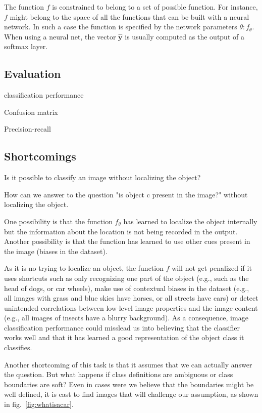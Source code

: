 The function $f$ is constrained to belong to a set of possible function. For instance, $f$ might belong to the space of all the functions that can be built with a neural network. In such a case the function is specified by the network parameters $\theta: f_\theta$. When using a neural net, the vector $\hat{\mathbf{y}}$ is usually computed as the output of a softmax layer.

\subsection{Evaluation}

classification performance

Confusion matrix

Precision-recall

\subsection{Shortcomings}


Is it possible to classify an image without localizing the object?

How can we answer to the question "is object c present in the image?" without localizing the object.

One possibility is that the function $f_\theta$ has learned to localize the object internally but the information about the location is not being recorded in the output. Another possibility is that the function has learned to use other cues present in the image (biases in the dataset).

As it is no trying to localize an object, the function $f$ will not get penalized if it uses shortcuts such as only recognizing one part of the object (e.g., such as the head of dogs, or car wheels),  make use of contextual biases in the dataset (e.g., all images with grass and blue skies have horses, or all streets have cars) or detect unintended correlations between low-level image properties and the image content (e.g., all images of insects have a blurry background). As a consequence, image classification performance could misslead us into believing that the classifier works well and that it has learned a good representation of the object class it classifies.

Another shortcoming of this task is that it assumes that we can actually answer the question. But what happens if class definitions are ambiguous or class boundaries are soft? Even in cases were we believe that the boundaries might be well defined, it is east to find images that will challenge our assumption, as shown in fig.~\ref{fig:whatisacar}.


